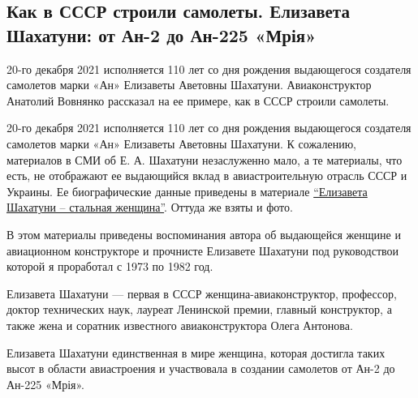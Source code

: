  
 
 
 
 
\subsection{Как в СССР строили самолеты. Елизавета Шахатуни: от Ан-2 до Ан-225 «Мрія»}
\label{sec:13_12_2021.stz.news.ua.hvylya.1.vovnjanko_shahatuni_an225}


20-го декабря 2021 исполняется 110 лет со дня рождения выдающегося создателя
самолетов марки «Ан» Елизаветы Аветовны Шахатуни. Авиаконструктор Анатолий
Вовнянко рассказал на ее примере, как в СССР строили самолеты.


20-го декабря 2021 исполняется 110 лет со дня рождения выдающегося создателя
самолетов марки «Ан» Елизаветы Аветовны Шахатуни. К сожалению, материалов в СМИ
об Е. А. Шахатуни незаслуженно мало, а те материалы, что есть, не отображают ее
выдающийся вклад в авиастроительную отрасль СССР и Украины. Ее биографические
данные приведены в материале \href{https://vstrokax.net/istoriya/elizaveta-shahatuni-stalnaya-ledi/}{\enquote{Елизавета Шахатуни – стальная женщина}}. Оттуда же
взяты и фото.

В этом материалы приведены воспоминания автора об выдающейся женщине и
авиационном конструкторе и прочнисте Елизавете Шахатуни под руководствои
которой я проработал с 1973 по 1982 год.

Елизавета Шахатуни — первая в СССР женщина-авиаконструктор, профессор, доктор
технических наук, лауреат Ленинской премии, главный конструктор, а также жена и
соратник известного авиаконструктора Олега Антонова.

Елизавета Шахатуни единственная в мире женщина, которая достигла таких высот в
области авиастроения и участвовала в создании самолетов от Ан-2 до Ан-225
«Мрія».

